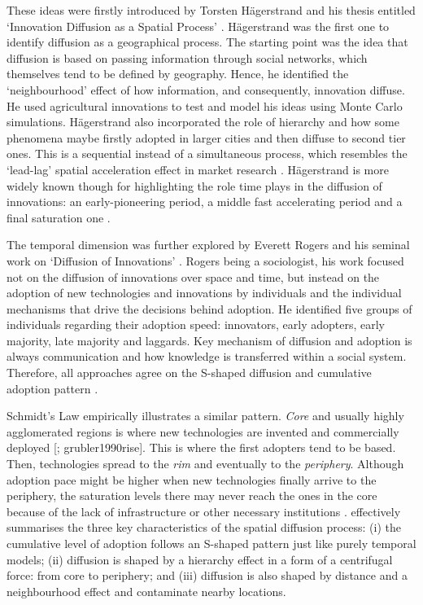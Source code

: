 \documentclass[
  authoryear,
  preprint,
  3p]{elsarticle}
\begin{document}
These ideas were firstly introduced by Torsten Hägerstrand and his
thesis entitled `Innovation Diffusion as a Spatial Process'
\citep{hagerstrand1968innovation}. Hägerstrand was the first one to
identify diffusion as a geographical process. The starting point was the
idea that diffusion is based on passing information through social
networks, which themselves tend to be defined by geography. Hence, he
identified the `neighbourhood' effect of how information, and
consequently, innovation diffuse. He used agricultural innovations to
test and model his ideas using Monte Carlo simulations. Hägerstrand also
incorporated the role of hierarchy and how some phenomena maybe firstly
adopted in larger cities and then diffuse to second tier ones. This is a
sequential instead of a simultaneous process, which resembles the
`lead-lag' spatial acceleration effect in market research
\citep{bento2018time, PERES201091}. Hägerstrand is more widely known
though for highlighting the role time plays in the diffusion of
innovations: an early-pioneering period, a middle fast accelerating
period and a final saturation one \citep{morrill2020spatial}.

The temporal dimension was further explored by Everett Rogers and his
seminal work on `Diffusion of Innovations' \citep{rogers2010diffusion}.
Rogers being a sociologist, his work focused not on the diffusion of
innovations over space and time, but instead on the adoption of new
technologies and innovations by individuals and the individual
mechanisms that drive the decisions behind adoption. He identified five
groups of individuals regarding their adoption speed: innovators, early
adopters, early majority, late majority and laggards. Key mechanism of
diffusion and adoption is always communication and how knowledge is
transferred within a social system. Therefore, all approaches agree on
the S-shaped diffusion and cumulative adoption pattern
\citep{grubler1990rise}.

Schmidt's Law empirically illustrates a similar pattern. \emph{Core} and
usually highly agglomerated regions is where new technologies are
invented and commercially deployed {[}\citet{grubler1990rise};
grubler1990rise{]}. This is where the first adopters tend to be based.
Then, technologies spread to the \emph{rim} and eventually to the
\emph{periphery}. Although adoption pace might be higher when new
technologies finally arrive to the periphery, the saturation levels
there may never reach the ones in the core because of the lack of
infrastructure or other necessary institutions
\citep{leibowicz2016representing}. \citet{grubler1990rise} effectively
summarises the three key characteristics of the spatial diffusion
process: (i) the cumulative level of adoption follows an S-shaped
pattern just like purely temporal models; (ii) diffusion is shaped by a
hierarchy effect in a form of a centrifugal force: from core to
periphery; and (iii) diffusion is also shaped by distance and a
neighbourhood effect and contaminate nearby locations.
\end{document}
